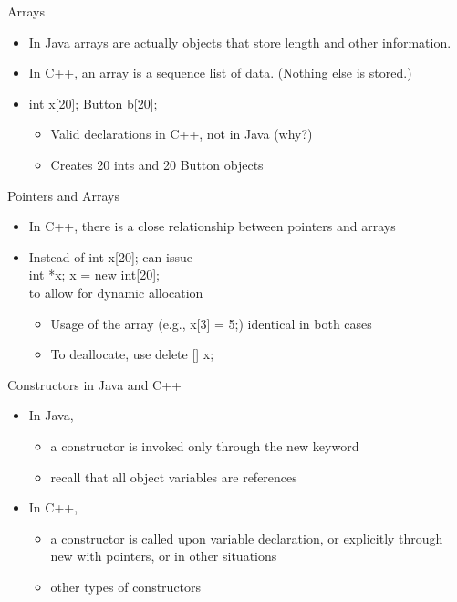 \documentclass{beamer}
\begin{document}
\begin{frame}{Arrays}
\begin{itemize}
\item In Java arrays are actually objects that store length and other information.
\item In C++, an array is a sequence list of data. (Nothing else is stored.)

\item int x[20]; Button b[20];
\begin{itemize}
\item Valid declarations in C++, not in Java (why?)
\item Creates 20 ints and 20 Button objects
\end{itemize}
\end{itemize}
\end{frame}

\begin{frame}{Pointers and Arrays}
\begin{itemize}
\item In C++, there is a close relationship between pointers and arrays
\item Instead of int x[20]; can issue \\
int *x;  x = new int[20]; \\
to allow for dynamic allocation
\begin{itemize}
\item Usage of the array (e.g., x[3] = 5;) identical in both cases
\item To deallocate, use delete [] x;
\end{itemize}
\end{itemize}
\end{frame}

\begin{frame}{Constructors in Java and C++}
\begin{itemize}
\item In Java,
\begin{itemize}
\item a constructor is invoked only through the new keyword
\item recall that all object variables are references
\end{itemize}
\item In C++,
\begin{itemize}
\item a constructor is called upon variable declaration, or explicitly through new  with pointers, or in other situations
\item other types of constructors
\end{itemize}
\end{itemize}
\end{frame}
\end{document}
